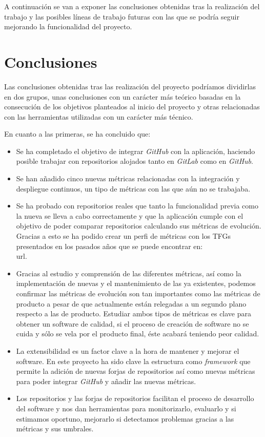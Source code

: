 
A continuación se van a exponer las conclusiones obtenidas tras la realización del trabajo y las posibles líneas de trabajo futuras con las que se podría seguir mejorando la funcionalidad del proyecto.

\section{Conclusiones}
Las conclusiones obtenidas tras las realización del proyecto podríamos dividirlas en dos grupos, unas conclusiones con un carácter más teórico basadas en la consecución de los objetivos planteados al inicio del proyecto y otras relacionadas con las herramientas utilizadas con un carácter más técnico.

En cuanto a las primeras, se ha concluido que:

\begin{itemize}
	\item Se ha completado el objetivo de integrar \textit{GitHub} con la aplicación, haciendo posible trabajar con repositorios alojados tanto en \textit{GitLab} como en \textit{GitHub}.
	\item Se han añadido cinco nuevas métricas relacionadas con la integración y despliegue continuos, un tipo de métricas con las que aún no se trabajaba.
	\item Se ha probado con repositorios reales que tanto la funcionalidad previa como la nueva se lleva a cabo correctamente y que la aplicación cumple con el objetivo de poder comparar repositorios calculando sus métricas de evolución. Gracias a esto se ha podido crear un perfi de métricas con los TFGs presentados en los pasados años que se puede encontrar en: \\url{}.
	\item Gracias al estudio y comprensión de las diferentes métricas, así como la implementación de nuevas y el mantenimiento de las ya existentes, podemos confirmar las métricas de evolución son tan importantes como las métricas de producto a pesar de que actualmente están relegadas a un segundo plano respecto a las de producto. Estudiar ambos tipos de métricas es clave para obtener un software de calidad, si el proceso de creación de software no se cuida y sólo se vela por el producto final, éste acabará teniendo peor calidad. 
	\item La extensibilidad es un factor clave a la hora de mantener y mejorar el software. En este proyecto ha sido clave la estructura como \textit{framework} que permite la adición de nuevas forjas de repositorios así como nuevas métricas para poder integrar \textit{GitHub} y añadir las nuevas métricas.
	\item Los repositorios y las forjas de repositorios facilitan el proceso de desarrollo del software y nos dan herramientas para monitorizarlo, evaluarlo y si estimamos oportuno, mejorarlo si detectamos problemas gracias a las métricas y sus umbrales.
\end{itemize}

